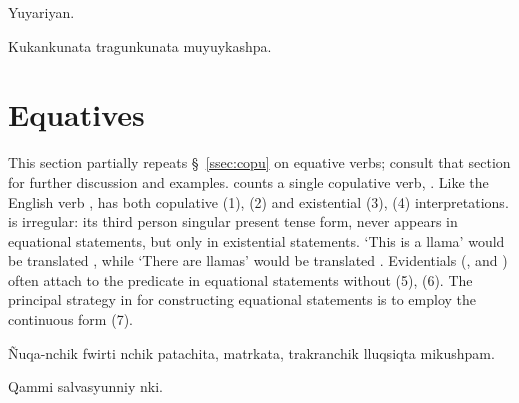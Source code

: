 %
{Yuyariyan.}%
{}%
{}{}%

%
{Kukankunata tragunkunata muyuykashpa.}%
{}%
{}{}%

\section{Equatives}\label{sec:equative}
This section partially repeats \S~\ref{ssec:copu} on equative verbs; consult that section for further discussion and examples. \SYQ{} counts a single copulative verb, . Like the English verb ,  has both copulative (1), (2) and existential (3), (4) interpretations.  is irregular: its third person singular present tense form,  never appears in equational statements, but only in existential statements. `This is a llama' would be translated  , while `There are llamas' would be translated . Evidentials (,  and ) often attach to the predicate in equational statements without  (5), (6). The principal strategy in \SYQ{} for constructing equational statements is to employ the continuous form  (7).

%
{\~Nuqa-nchik fwirti nchik patachita, matrkata, trakranchik lluqsiqta mikushpam.}%
{}%
{}{}%

%
{Qammi salvasyunniy nki.}%
{}%
{}{}%

